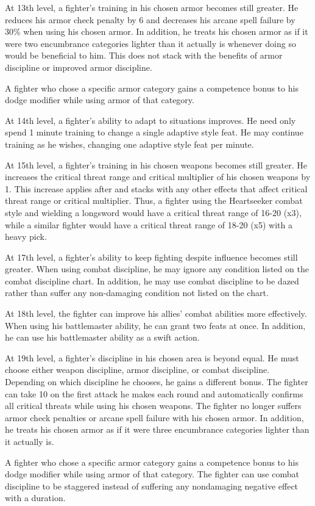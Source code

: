  At 13th level, a fighter's training in his chosen armor becomes still greater. He reduces his armor check penalty by 6 and decreases his arcane spell failure by 30\% when using his chosen armor. In addition, he treats his chosen armor as if it were two encumbrance categories lighter than it actually is whenever doing so would be beneficial to him. This does not stack with the benefits of armor discipline or improved armor discipline.
\par A fighter who chose a specific armor category gains a  competence bonus to his dodge modifier while using armor of that category.

 At 14th level, a fighter's ability to adapt to situations improves. He need only spend 1 minute training to change a single adaptive style feat. He may continue training as he wishes, changing one adaptive style feat per minute.

 At 15th level, a fighter's training in his chosen weapons becomes still greater. He increases the critical threat range and critical multiplier of his chosen weapons by 1. This increase applies after and stacks with any other effects that affect critical threat range or critical multiplier. Thus, a fighter using the Heartseeker combat style and wielding a longsword would have a critical threat range of 16-20 (x3), while a similar fighter would have a critical threat range of 18-20 (x5) with a heavy pick.

 At 17th level, a fighter's ability to keep fighting despite influence becomes still greater. When using combat discipline, he may ignore any condition listed on the combat discipline chart. In addition, he may use combat discipline to be dazed rather than suffer any non-damaging condition not listed on the chart.

 At 18th level, the fighter can improve his allies' combat abilities more effectively. When using his battlemaster ability, he can grant two feats at once. In addition, he can use his battlemaster ability as a swift action.

 At 19th level, a fighter's discipline in his chosen area is beyond equal. He must choose either weapon discipline, armor discipline, or combat discipline. Depending on which discipline he chooses, he gains a different bonus.
 The fighter can take 10 on the first attack he makes each round and automatically confirms all critical threats while using his chosen weapons.
 The fighter no longer suffers armor check penalties or arcane spell failure with his chosen armor. In addition, he treats his chosen armor as if it were three encumbrance categories lighter than it actually is.
\par A fighter who chose a specific armor category gains a  competence bonus to his dodge modifier while using armor of that category.
 The fighter can use combat discipline to be staggered instead of suffering any nondamaging negative effect with a duration.

